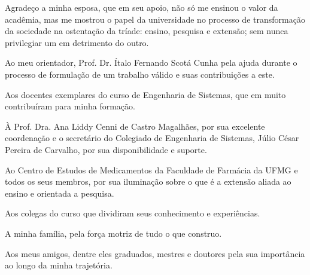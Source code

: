 
\begin{agradecimentos}


Agradeço a minha esposa, que em seu apoio, não só me ensinou o valor da acadêmia, mas me mostrou o papel da universidade no processo de transformação da sociedade na ostentação da tríade: ensino, pesquisa e extensão; sem nunca privilegiar um em detrimento do outro.

Ao meu orientador, Prof. Dr. Ítalo Fernando Scotá Cunha pela ajuda durante o processo de formulação de um trabalho válido e suas contribuições a este.

Aos docentes exemplares do curso de Engenharia de Sistemas, que em muito contribuíram para minha formação.

À Prof. Dra. Ana Liddy Cenni de Castro Magalhães, por sua excelente coordenação e o secretário do Colegiado de Engenharia de Sistemas, Júlio César Pereira de Carvalho, por sua disponibilidade e suporte.

Ao Centro de Estudos de Medicamentos da Faculdade de Farmácia da UFMG e todos os seus membros, por sua iluminação sobre o que é a extensão aliada ao ensino e orientada a pesquisa.

Aos colegas do curso que dividiram seus conhecimento e experiências.

A minha família, pela força motriz de tudo o que construo.

Aos meus amigos, dentre eles graduados, mestres e doutores pela sua importância ao longo da minha trajetória.

\end{agradecimentos}
